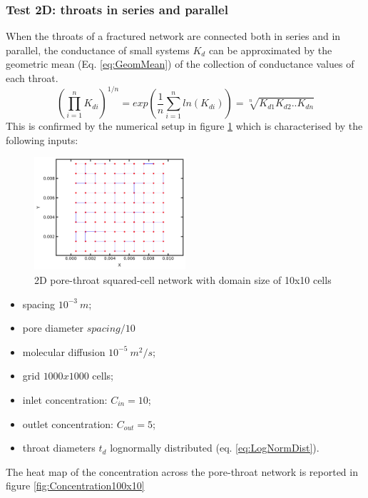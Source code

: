 \documentclass{article}
\begin{document}
\subsubsection{Test 2D: throats in series and parallel}
When the throats of a fractured network are connected both in series and in parallel, the conductance of small systems $K_d$ can be approximated by the geometric mean (Eq. \ref{eq:GeomMean}) of the collection of conductance values of each throat.
\begin{equation}
    \left( \prod_{i=1}^n K_{di} \right)^{1/n} = exp \left(\frac{1}{n} \sum_{i=1}^n ln(K_{di}) \right) = \sqrt[n]{K_{d1}K_{d2}..K_{dn}}
    \label{eq:GeomMean}
\end{equation}
This is confirmed by the numerical setup in figure \ref{fig:Network2D} which is characterised by the following inputs:
\begin{figure}[htbp]
    \centering
    \includegraphics[width=0.5\textwidth]{images/fromOpenPNM/rectangular2Dpn10x10.png}
    \caption{2D pore-throat squared-cell network with domain size of 10x10 cells}
    \label{fig:Network2D}
\end{figure}
\begin{itemize}
    \item spacing $10^{-3} \: m$;
    \item pore diameter $spacing/10$
    \item molecular diffusion $10^{-5} \: m^2/s$;
    \item grid $1000x1000$ cells;
    \item inlet concentration: $C_{in}=10$;
    \item outlet concentration: $C_{out}=5$;
    \item throat diameters $t_d$ lognormally distributed (eq. \ref{eq:LogNormDist}).  
\end{itemize}
The heat map of the concentration across the pore-throat network is reported in figure \ref{fig:Concentration100x10}
\end{document}
